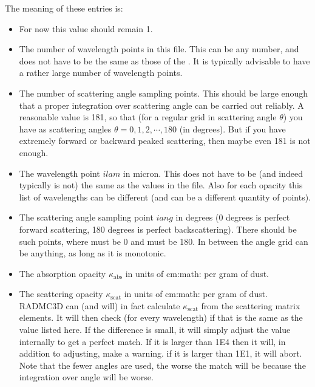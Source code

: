 \documentclass[letterpaper,10pt,english]{sphinxmanual}
\begin{document}
The meaning of these entries is:
\begin{itemize}
\item {} 
 For now this value should remain 1.

\item {} 
 The number of wavelength points in this file. This
can be any number, and does not have to be the same as those of the
. It is typically advisable to have a rather
large number of wavelength points.

\item {} 
 The number of scattering angle sampling points.
This should be large enough that a proper integration over scattering angle
can be carried out reliably. A reasonable value is 181, so that (for
a regular grid in scattering angle \(\theta\)) you have as scattering angles
\(\theta=0,1,2,\cdots,180\) (in degrees). But if you have extremely forward\sphinxhyphen{}
or backward peaked scattering, then maybe even 181 is not enough.

\item {} 
 The wavelength point \(ilam\) in micron. This does
not have to be (and indeed typically is not) the same as the values in the
 file. Also for each opacity this list of
wavelengths can be different (and can be a different quantity of points).

\item {} 
 The scattering angle
sampling point \(iang\) in degrees (0 degrees is perfect forward scattering,
180 degrees is perfect backscattering). There should be 
such points, where  must be 0 and
 must be 180. In between the angle
grid can be anything, as long as it is monotonic.

\item {} 
 The absorption opacity \(\kappa_{\mathrm{abs}}\) in units of cm:math: per gram of dust.

\item {} 
 The scattering opacity
\(\kappa_{\mathrm{scat}}\) in units of cm:math: per gram of dust. RADMC\sphinxhyphen{}3D can
(and will) in fact calculate \(\kappa_{\mathrm{scat}}\) from the scattering
matrix elements. It will then check (for every wavelength) if that is the
same as the value listed here. If the difference is small, it will simply
adjust the  value internally to get a
perfect match. If it is larger than 1E\sphinxhyphen{}4 then it will, in addition to
adjusting, make a warning. if it is larger than 1E\sphinxhyphen{}1, it will abort. Note
that the fewer angles are used, the worse the match will be because the
integration over angle will be worse.


\end{itemize}
\end{document}
